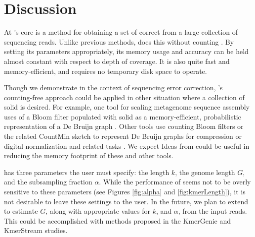 \documentclass[10pt]{article}
\begin{document}
\section*{Discussion}
At \tool's core is a method for obtaining a set of correct \kmers from a large collection of sequencing reads.
Unlike previous methods, \tool does this without counting \kmers.
By setting its parameters appropriately, its memory usage and accuracy can be held almost constant with respect to depth of coverage.
It is also quite fast and memory-efficient, and requires no temporary disk space to operate.

Though we demonstrate \tool in the context of sequencing error correction, \tool's counting-free approach could be applied in other situation where a collection of solid \kmers is desired.
For example, one tool for scaling metagenome sequence assembly uses of a Bloom filter populated with solid \kmers as a memory-efficient, probabilistic representation of a De Bruijn graph \cite{pell2012scaling}.
Other tools use counting Bloom filters \cite{fan2000summary, bonomi2006improved} or the related CountMin sketch \cite{cormode2005improved} to represent De Bruijn graphs for compression \cite{jones2012compression} or digital normalization and related tasks \cite{zhang2013these}.
We expect Ideas from \tool could be useful in reducing the memory footprint of these and other tools. 

\tool has three parameters the user must specify: the \kmer length $k$, the genome length $G$, and the subsampling fraction $\alpha$.
While the performance of \tool seems not to be overly sensitive to these parameters (see Figures \ref{fig:alpha} and \ref{fig:kmerLength}), it is not desirable to leave these settings to the user.
In the future, we plan to extend \tool to estimate $G$, along with appropriate values for $k$, and $\alpha$, from the input reads.
This could be accomplished with methods proposed in the KmerGenie \cite{chikhi2014informed} and KmerStream \cite{melsted2014kmerstream} studies.


\end{document}
